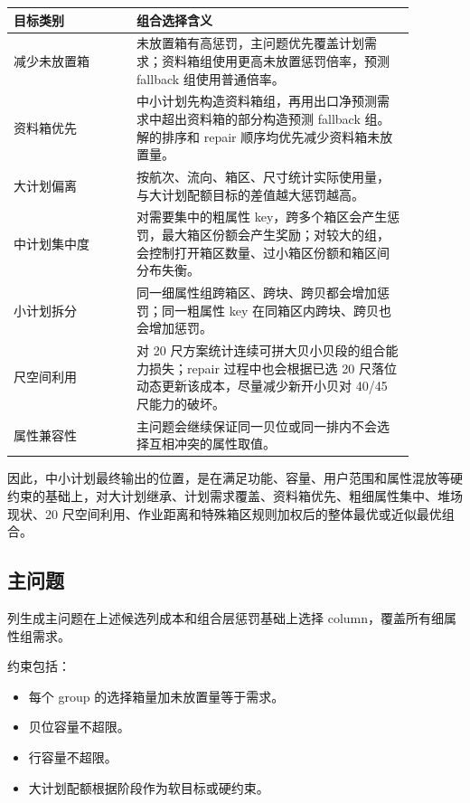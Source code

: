 \documentclass[UTF8,fontset=windows,zihao=-4]{ctexart}
\begin{document}
\begin{longtable}{>{\raggedright\arraybackslash}p{0.27\linewidth}>{\raggedright\arraybackslash}p{0.61\linewidth}}
\toprule
目标类别 & 组合选择含义 \\
\midrule
减少未放置箱 & 未放置箱有高惩罚，主问题优先覆盖计划需求；资料箱组使用更高未放置惩罚倍率，预测 fallback 组使用普通倍率。 \\
资料箱优先 & 中小计划先构造资料箱组，再用出口净预测需求中超出资料箱的部分构造预测 fallback 组。解的排序和 repair 顺序均优先减少资料箱未放置量。 \\
大计划偏离 & 按航次、流向、箱区、尺寸统计实际使用量，与大计划配额目标的差值越大惩罚越高。 \\
中计划集中度 & 对需要集中的粗属性 key，跨多个箱区会产生惩罚，最大箱区份额会产生奖励；对较大的组，会控制打开箱区数量、过小箱区份额和箱区间分布失衡。 \\
小计划拆分 & 同一细属性组跨箱区、跨块、跨贝都会增加惩罚；同一粗属性 key 在同箱区内跨块、跨贝也会增加惩罚。 \\
20 尺空间利用 & 对 20 尺方案统计连续可拼大贝小贝段的组合能力损失；repair 过程中也会根据已选 20 尺落位动态更新该成本，尽量减少新开小贝对 40/45 尺能力的破坏。 \\
属性兼容性 & 主问题会继续保证同一贝位或同一排内不会选择互相冲突的属性取值。 \\
\bottomrule
\end{longtable}

因此，中小计划最终输出的位置，是在满足功能、容量、用户范围和属性混放等硬约束的基础上，对大计划继承、计划需求覆盖、资料箱优先、粗细属性集中、堆场现状、20 尺空间利用、作业距离和特殊箱区规则加权后的整体最优或近似最优组合。

\subsection{主问题}

列生成主问题在上述候选列成本和组合层惩罚基础上选择 column，覆盖所有细属性组需求。

约束包括：

\begin{itemize}
  \item 每个 group 的选择箱量加未放置量等于需求。
  \item 贝位容量不超限。
  \item 行容量不超限。
  \item 大计划配额根据阶段作为软目标或硬约束。
\end{itemize}
\end{document}
